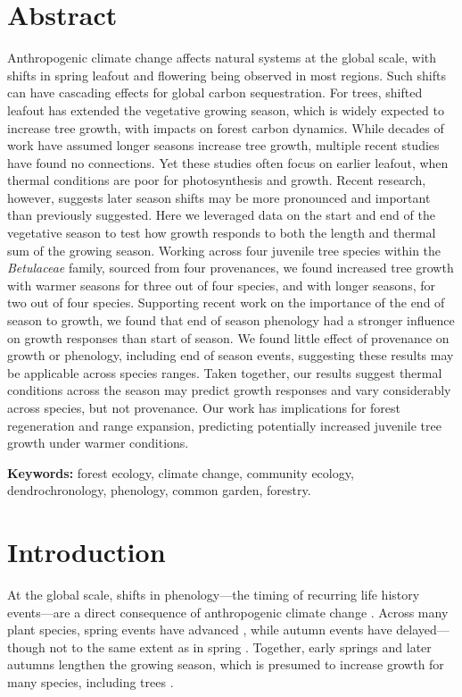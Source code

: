 \documentclass{article}\usepackage[]{graphicx}\usepackage[]{xcolor}
\begin{document}
\section{Abstract}
Anthropogenic climate change affects natural systems at the global scale, with shifts in spring leafout and flowering being observed in most regions. Such shifts can have cascading effects for global carbon sequestration. For trees, shifted leafout has extended the vegetative growing season, which is widely expected to increase tree growth, with impacts on forest carbon dynamics. While decades of work have assumed longer seasons increase tree growth, multiple recent studies have found no connections. Yet these studies often focus on earlier leafout, when thermal conditions are poor for photosynthesis and growth. Recent research, however, suggests later season shifts may be more pronounced and important than previously suggested. Here we leveraged data on the start and end of the vegetative season to test how growth responds to both the length and thermal sum of the growing season. Working across four juvenile tree species within the \textit{Betulaceae} family, sourced from four provenances, we found increased tree growth with warmer seasons for three out of four species, and with longer seasons, for two out of four species. Supporting recent work on the importance of the end of season to growth, we found that end of season phenology had a stronger influence on growth responses than start of season. We found little effect of provenance on growth or phenology, including end of season events, suggesting these results may be applicable across species ranges. Taken together, our results suggest thermal conditions across the season may predict growth responses and vary considerably across species, but not provenance. Our work has implications for forest regeneration and range expansion, predicting potentially increased juvenile tree growth under warmer conditions.

\textbf{Keywords:} forest ecology, climate change, community ecology, dendrochronology, phenology, common garden, forestry.

\section{Introduction}

At the global scale, shifts in phenology---the timing of recurring life history events---are a direct consequence of anthropogenic climate change \citep{parmesan_poleward_1999, menzel_european_2006, calvin_ipcc_2023}. Across many plant species, spring events have advanced \citep{wolfe_climate_2005,chmielewski_response_2001,fu_recent_2014}, while autumn events have delayed---though not to the same extent as in spring \citep{gallinat_autumn_2015,jeong_macroscale_2014}. Together, early springs and later autumns lengthen the growing season, which is presumed to increase growth for many species, including trees \citep{keenan_net_2014, stridbeck_partly_2022}. 
\end{document}
